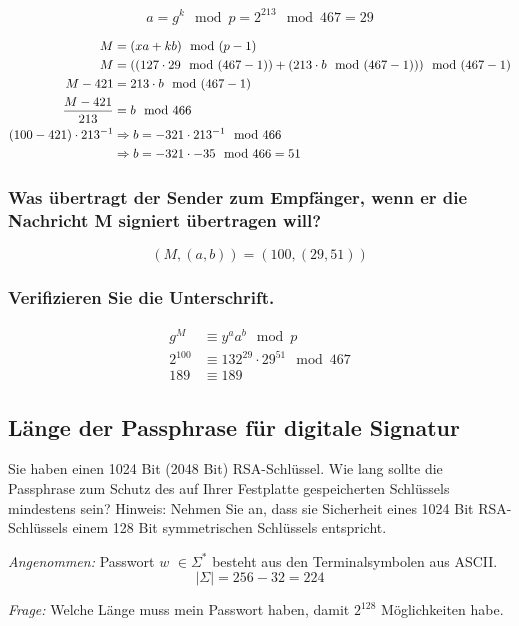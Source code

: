 \[ a = g^k \mod p = 2^213 \mod 467 = 29 \]

\begin{align}
	                 M &= (xa + kb) \mod (p-1) \\
                     M &= ((127\cdot 29 \mod (467-1)) + (213 \cdot b \mod (467-1))) \mod (467-1) \\
               M - 421 &=  213 \cdot b \mod (467-1) \\
	\dfrac{M-421}{213} &= b \mod 466 \\
	(100 - 421) \cdot 213^{-1} &\Rightarrow b = -321\cdot 213^{-1} \mod 466 \\
							   &\Rightarrow b = -321 \cdot -35 \mod 466 = 51	
\end{align}

\subsubsection{Was übertragt der Sender zum Empfänger, wenn er die Nachricht M signiert
übertragen will?}

	\[ (M, (a,b)) = (100, (29,51)) \]

\subsubsection{Verifizieren Sie die Unterschrift.}

\begin{align}
	g^M     &\equiv y^a a^b \mod p 					\\
	2^{100} &\equiv 132^{29} \cdot 29^{51} \mod 467	\\
	189     &\equiv 189		
\end{align}

\subsection{Länge der Passphrase für digitale Signatur}

Sie haben einen 1024 Bit (2048 Bit) RSA-Schlüssel. Wie lang sollte die Passphrase
zum Schutz des auf Ihrer Festplatte gespeicherten Schlüssels mindestens sein?
Hinweis: Nehmen Sie an, dass sie Sicherheit eines 1024 Bit RSA-Schlüssels einem
128 Bit symmetrischen Schlüssels entspricht.

\textit{Angenommen:} Passwort $w$ $\in \Sigma^*$ besteht aus den Terminalsymbolen aus ASCII.
\[|\Sigma| = 256-32 = 224\]

\textit{Frage:} Welche Länge muss mein Passwort haben, damit $2^128$ Möglichkeiten habe.

